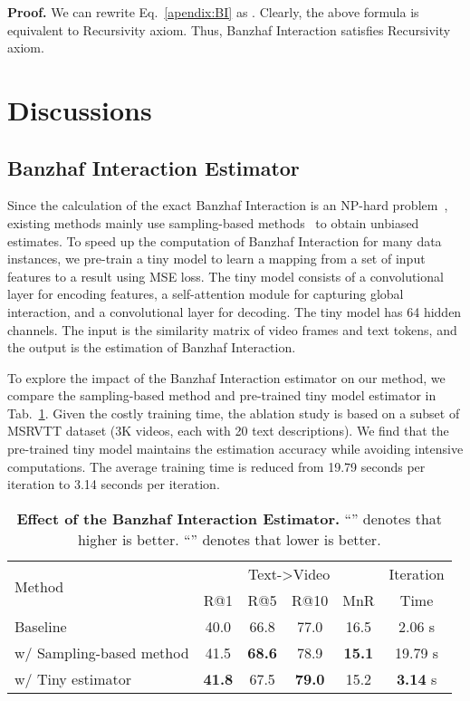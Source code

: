 \documentclass[10pt,twocolumn,letterpaper]{article}
\newcommand{\tabfootnotesize}{\fontsize{8}{9}\selectfont}
\newcommand{\myparagraph}[1]{\textbf{#1}\hspace{1.8ex}}
\begin{document}
{\myparagraph{Proof.} We can rewrite Eq.~\ref{apendix:BI} as . Clearly, the above formula is equivalent to Recursivity axiom. Thus, Banzhaf Interaction satisfies Recursivity axiom.

\section{Discussions}
\subsection{Banzhaf Interaction Estimator}
Since the calculation of the exact Banzhaf Interaction is an NP-hard problem~\cite{matsui2001np}, existing methods mainly use sampling-based methods~\cite{leech2002computation,bachrach2010approximating} to obtain unbiased estimates. To speed up the computation of Banzhaf Interaction for many data instances, we pre-train a tiny model to learn a mapping from a set of input features to a result using MSE loss. The tiny model consists of a convolutional layer for encoding features, a self-attention module for capturing global interaction, and a convolutional layer for decoding. The tiny model has 64 hidden channels. The input is the similarity matrix of video frames and text tokens, and the output is the estimation of Banzhaf Interaction. 

To explore the impact of the Banzhaf Interaction estimator on our method, we compare the sampling-based method and pre-trained tiny model estimator in Tab.~\ref{tab:ban}. Given the costly training time, the ablation study is based on a subset of MSRVTT dataset (3K videos, each with 20 text descriptions). We find that the pre-trained tiny model maintains the estimation accuracy while avoiding intensive computations. The average training time is reduced from 19.79 seconds per iteration to 3.14 seconds per iteration.

\begin{table}[tb]
\tabfootnotesize
\centering
\setlength{\tabcolsep}{1.5pt}
\begin{tabular}{lccccc}
\toprule[1.25pt]
\multirow{2}{*}{Method} & \multicolumn{4}{c}{{Text-\textgreater{}Video}} & Iteration \\
\cline{2-5}
  & R@1 & R@5 & R@10 & MnR & Time  \\
 \midrule
Baseline & 40.0 & 66.8 & 77.0 & 16.5 & 2.06 s\\
\midrule
w/ Sampling-based method  & 41.5 & \textbf{68.6} & 78.9 & \textbf{15.1} & 19.79 s\\
\rowcolor{aliceblue!60} w/ Tiny estimator  & \textbf{41.8} & 67.5 & \textbf{79.0} & 15.2  & \textbf{3.14} s\\
\bottomrule[1.25pt]
\end{tabular}
\caption{\textbf{Effect of the Banzhaf Interaction Estimator.}  ``'' denotes that higher is better. ``'' denotes that lower is better.}
\label{tab:ban}
\end{table}

}
\end{document}
